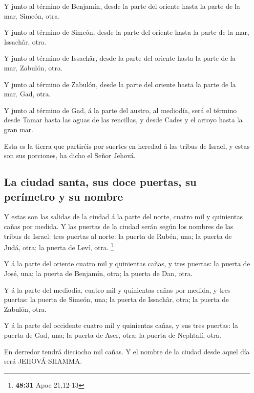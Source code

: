  Y junto al término de Benjamín, desde la parte del oriente
hasta la parte de la mar, Simeón, otra.

 Y junto al término de Simeón, desde la parte del oriente
hasta la parte de la mar, Issachâr, otra.

 Y junto al término de Issachâr, desde la parte del oriente
hasta la parte de la mar, Zabulón, otra.

 Y junto al término de Zabulón, desde la parte del oriente
hasta la parte de la mar, Gad, otra.

 Y junto al término de Gad, á la parte del austro, al
mediodía, será el término desde Tamar hasta las aguas de las rencillas,
y desde Cades y el arroyo hasta la gran mar.

 Esta es la tierra que partiréis por suertes en heredad á
las tribus de Israel, y estas son sus porciones, ha dicho el Señor
Jehová.

\hypertarget{la-ciudad-santa-sus-doce-puertas-su-peruxedmetro-y-su-nombre}{%
\subsection{La ciudad santa, sus doce puertas, su perímetro y su
nombre}\label{la-ciudad-santa-sus-doce-puertas-su-peruxedmetro-y-su-nombre}}

 Y estas son las salidas de la ciudad á la parte del norte,
cuatro mil y quinientas cañas por medida.  Y las puertas de
la ciudad serán según los nombres de las tribus de Israel: tres puertas
al norte: la puerta de Rubén, una; la puerta de Judá, otra; la puerta de
Leví, otra. \footnote{\textbf{48:31} Apoc 21,12-13}

 Y á la parte del oriente cuatro mil y quinientas cañas, y
tres puertas: la puerta de José, una; la puerta de Benjamín, otra; la
puerta de Dan, otra.

 Y á la parte del mediodía, cuatro mil y quinientas cañas
por medida, y tres puertas: la puerta de Simeón, una; la puerta de
Issachâr, otra; la puerta de Zabulón, otra.

 Y á la parte del occidente cuatro mil y quinientas cañas,
y sus tres puertas: la puerta de Gad, una; la puerta de Aser, otra; la
puerta de Nephtalí, otra.

 En derredor tendrá dieciocho mil cañas. Y el nombre de la
ciudad desde aquel día será JEHOVÁ-SHAMMA.
